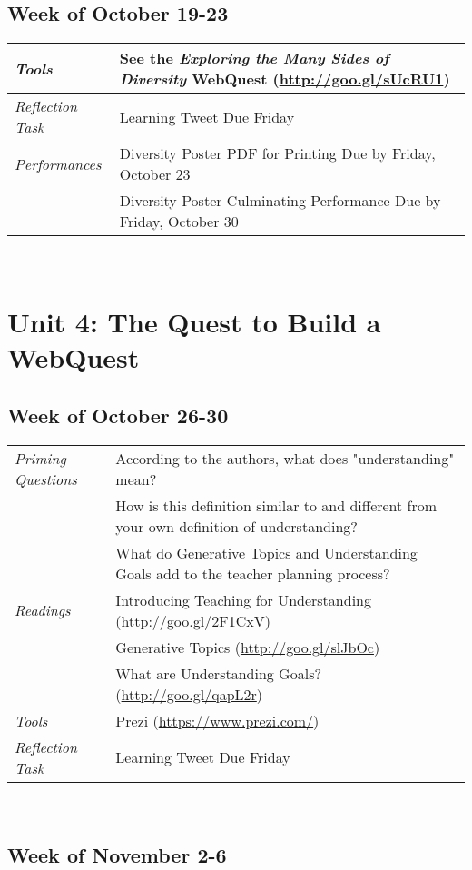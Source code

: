 \documentclass{tufte-handout}
\newcommand{\tabpq}{\faQuestionCircle\medspace\textit{Priming Questions}}
\newcommand{\tabread}{\faBook\medspace\textit{Readings}}
\newcommand{\tabperformance}{\faTasks\medspace\textit{Performances}}
\newcommand{\tabtools}{\faWrench\medspace\textit{Tools}}
\newcommand{\tabtweet}{\faLightbulbO\medspace\textit{Reflection Task} & Learning Tweet Due Friday \\}
\newenvironment{tabsched}
	{\small
	\begin{tabular}{p{1.5in}p{4.5in}}
	\toprule}
	{\bottomrule
	\end{tabular}
	\normalsize\\}
\newcommand{\weekten}{October 19-23}
\newcommand{\weekeleven}{October 26-30}
\newcommand{\weektwelve}{November 2-6}
\begin{document}
\begin{fullwidth}
\subsection{Week of \weekten}

\begin{tabsched}
	\tabtools & See the \textit{Exploring the Many Sides of Diversity} WebQuest (\url{http://goo.gl/sUcRU1}) \\
	\midrule
	\tabtweet
	\midrule
	\tabperformance & Diversity Poster PDF for Printing Due by Friday, October 23 \\
	& Diversity Poster Culminating Performance Due by Friday, October 30 \\
\end{tabsched}

\section{Unit 4: The Quest to Build a WebQuest}

\subsection{Week of \weekeleven}

\begin{tabsched}
	\tabpq & According to the authors, what does "understanding" mean? \\
	& How is this definition similar to and different from your own definition of understanding? \\
	& What do Generative Topics and Understanding Goals add to the teacher planning process? \\
	\midrule
	\tabread & Introducing Teaching for Understanding (\url{http://goo.gl/2F1CxV}) \\
	& Generative Topics (\url{http://goo.gl/slJbOc}) \\
	& What are Understanding Goals? (\url{http://goo.gl/qapL2r}) \\
	\midrule
	\tabtools & Prezi (\url{https://www.prezi.com/}) \\
	\midrule
	\tabtweet
\end{tabsched}

\subsection{Week of \weektwelve}


\end{fullwidth}
\end{document}
